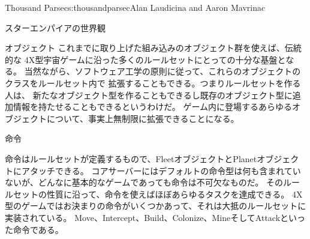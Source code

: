 \begin{aosachapter}{Thousand Parsec}{s:thousandparsec}{Alan Laudicina and Aaron Mavrinac}
\begin{aosasect1}{スターエンパイアの世界観}
\begin{aosasect2}{オブジェクト}
これまでに取り上げた組み込みのオブジェクト群を使えば、伝統的な
4X型宇宙ゲームに沿った多くのルールセットにとっての十分な基盤となる。
当然ながら、ソフトウェア工学の原則に従って、これらのオブジェクトのクラスをルールセット内で
拡張することもできる。つまりルールセットを作る人は、
新たなオブジェクト型を作ることもできるし既存のオブジェクト型に追加情報を持たせることもできるというわけだ。
ゲーム内に登場するあらゆるオブジェクトについて、事実上無制限に拡張できることになる。

\end{aosasect2}

\begin{aosasect2}{命令}

命令はルールセットが定義するもので、FleetオブジェクトとPlanetオブジェクトにアタッチできる。
コアサーバーにはデフォルトの命令型は何も含まれていないが、どんなに基本的なゲームであっても命令は不可欠なものだ。
そのルールセットの性質に沿って、命令を使えばほぼあらゆるタスクを達成できる。
4X型のゲームではお決まりの命令がいくつかあって、それは大抵のルールセットに実装されている。
Move、Intercept、Build、Colonize、MineそしてAttackといった命令である。


\end{aosasect2}
\end{aosasect1}
\end{aosachapter}
